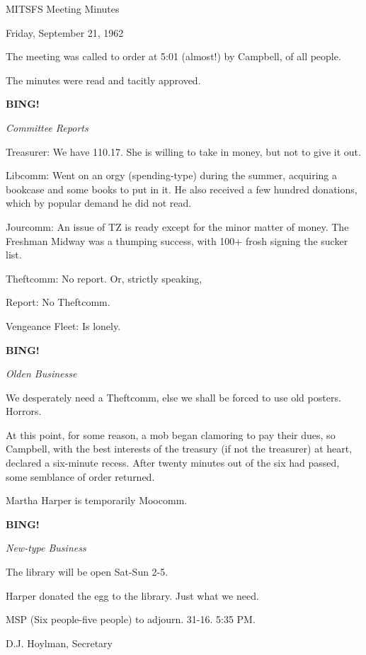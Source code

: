 \documentclass[12pt]{article}
\newcommand{\bing}{{\bf BING!} }
\newcommand{\goto}[1]{\bing \vskip 12pt \centerline{{\em{#1}}}}
\begin{document}
\begin{center}

MITSFS Meeting Minutes

Friday, September 21, 1962

\end{center}
 
\vspace{12pt}

\setlength{\parskip}{6pt}

\noindent
The meeting was called to order at 5:01 (almost!) by Campbell, of all people.

The minutes were read and tacitly approved.

\goto{Committee Reports}

Treasurer: We have 110.17. She is willing to take in money, but not to give it out.

Libcomm: Went on an orgy (spending-type) during the summer, acquiring a bookcase and some books to put in it. He also received a few hundred donations, which by popular demand he did not read.

Jourcomm: An issue of TZ is ready except for the minor matter of money. The Freshman Midway was a thumping success, with 100+ frosh signing the sucker list.

Theftcomm: No report. Or, strictly speaking,

Report: No Theftcomm.

Vengeance Fleet: Is lonely.

\goto{Olden Businesse}

We desperately need a Theftcomm, else we shall be forced to use old posters. Horrors.

At this point, for some reason, a mob began clamoring to pay their dues, so Campbell, with the best interests of the treasury (if not the treasurer) at heart, declared a six-minute recess. After twenty minutes out of the six had passed, some semblance of order returned.

Martha Harper is temporarily Moocomm.

\goto{New-type Business}

The library will be open Sat-Sun 2-5.

Harper donated the egg to the library. Just what we need.

MSP (Six people-five people) to adjourn. 31-16. 5:35 PM.

\vspace{12pt}

\centerline{D.J. Hoylman, Secretary}
\end{document}
